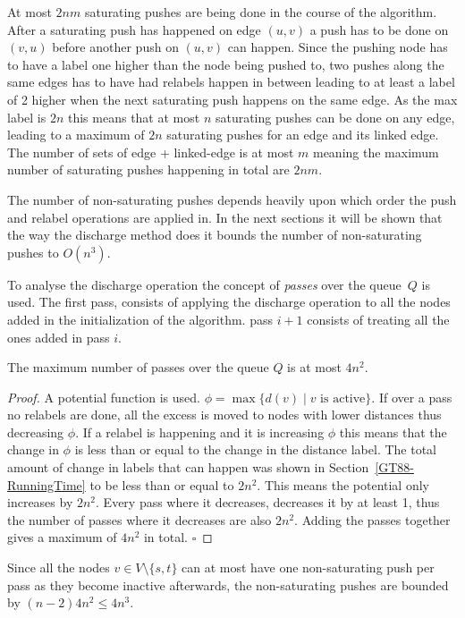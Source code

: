 At most $2nm$ saturating pushes are being done in the course of the algorithm. After a saturating push has happened
on edge $(u,v)$ a push has to be done on $(v,u)$ before another push on $(u,v)$ can happen. Since the
pushing node has to have a label one higher than the node being pushed to, two pushes along the same edges has to have had
relabels happen in between leading to at least a label of 2 higher when the next saturating push happens on 
the same edge. As the max label is $2n$ this means that at most $n$ saturating pushes can be done on any edge, leading
to a maximum of $2n$ saturating pushes for an edge and its linked edge. The number of sets of edge + linked-edge is at most $m$ meaning the
maximum number of saturating pushes happening in total are $2nm$.

The number of non-saturating pushes depends heavily upon which order the push and relabel operations are applied in. In the next sections it
will be shown that the way the discharge method does it bounds the number of non-saturating pushes to $O(n^3)$.

To analyse the discharge operation the concept of \emph{passes} over the queue~$Q$ is used. 
The first pass, consists of applying the discharge operation to all the nodes added in the initialization
of the algorithm. pass $i+1$ consists of treating all the ones added in pass $i$.
\begin{lemma}\label{GT88-Passes}
The maximum number of passes over the queue $Q$ is at most $4n^2$.
\end{lemma}
\begin{proof}
A potential function is used. $\phi = \max{\{d(v)\mid v\text{ is active}\}}$. If over a pass no relabels are done, all the 
excess is moved to nodes with lower distances thus decreasing $\phi$. If a relabel is happening and it is increasing $\phi$ this means that
the change in $\phi$ is less than or equal to the change in the distance label. 
The total amount of change in labels that can happen was shown in Section~\ref{GT88-RunningTime} to be less than or equal to $2n^2$.
This means the potential only increases by $2n^2$. Every pass where it decreases, decreases it by at least 1, thus
the number of passes where it decreases are also $2n^2$.
Adding the passes together gives a maximum of $4n^2$ in total. $\square$
\end{proof}
Since all the nodes $v \in V\setminus \{s,t\}$ can at most have one non-saturating push per pass as they become inactive afterwards, the non-saturating pushes
are bounded by $(n-2)4n^2 \leq 4n^3$. 

